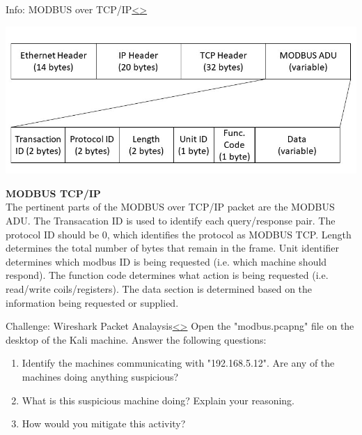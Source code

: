 \documentclass[12pt]{extarticle}
\newenvironment{instructionblock}{\Large\bgroup}{\egroup}
\newcommand{\ben}{\begin{enumerate}}
\newcommand{\een}{\end{enumerate}}
\newcounter{next}
\newcounter{prev}
\begin{document}
\begin{slide}{Info: MODBUS over TCP/IP}{\hyperref[slide \theprev]{\textless}\hyperref[slide \thenext]{\textgreater}}
\begin{instructionblock}
\begin{center}
	\includegraphics[scale=0.68]{Images/MODBUS1.JPG}
\end{center}
\end{instructionblock}
\end{slide}
\vfill
\noindent
\textbf{MODBUS TCP/IP}\\
The pertinent parts of the MODBUS over TCP/IP packet are the MODBUS ADU. The Transacation ID is used to identify each query/response pair. The protocol ID should be 0, which identifies the protocol as MODBUS TCP. Length determines the total number of bytes that remain in the frame. Unit identifier determines which modbus ID is being requested (i.e. which machine should respond). The function code determines what action is being requested (i.e. read/write coils/registers). The data section is determined based on the information being requested or supplied. \cite[p.124-127]{KnappLangill}

\pagebreak
{}
\begin{slide}{Challenge: Wireshark Packet Analaysis}{\hyperref[slide \theprev]{\textless}\hyperref[slide \thenext]{\textgreater}}
\begin{instructionblock}
Open the "modbus.pcapng" file on the desktop of the Kali machine. Answer the following questions:
	\ben
	\item Identify the machines communicating with "192.168.5.12". Are any of the machines doing anything suspicious?
	\item What is this suspicious machine doing? Explain your reasoning.
	\item How would you mitigate this activity?
	\een
\end{instructionblock}
\end{slide}
\end{document}
